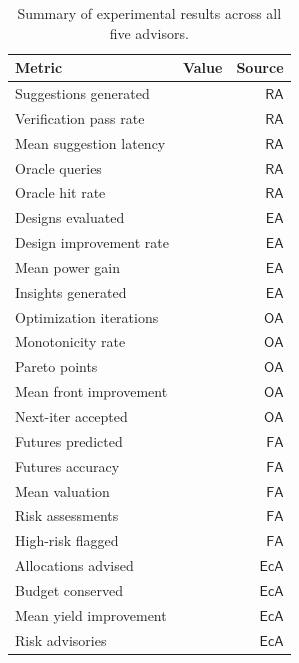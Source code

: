 \documentclass[11pt]{article}
\newcommand{\RA}{\mathsf{RA}}
\newcommand{\EA}{\mathsf{EA}}
\newcommand{\OA}{\mathsf{OA}}
\newcommand{\FA}{\mathsf{FA}}
\newcommand{\EcA}{\mathsf{EcA}}
\begin{document}
\begin{table}[t]
\centering
\caption{Summary of experimental results across all five advisors.}
\label{tab:results-summary}
\begin{tabular}{l r r}
\hline
\textbf{Metric} & \textbf{Value} & \textbf{Source} \\
\hline
Suggestions generated       & \ppXCIsuggestionsGenerated{}  & $\RA$ \\
Verification pass rate      & \ppXCIverificationPassRate{}  & $\RA$ \\
Mean suggestion latency     & \ppXCImeanSuggestionLatency{} & $\RA$ \\
Oracle queries              & \ppXCIoracleQueries{}         & $\RA$ \\
Oracle hit rate             & \ppXCIoracleHitRate{}         & $\RA$ \\
\hline
Designs evaluated           & \ppXCIdesignsEvaluated{}      & $\EA$ \\
Design improvement rate     & \ppXCIdesignImprovementRate{} & $\EA$ \\
Mean power gain             & \ppXCImeanPowerGain{}         & $\EA$ \\
Insights generated          & \ppXCIinsightsGenerated{}     & $\EA$ \\
\hline
Optimization iterations     & \ppXCIoptIterations{}         & $\OA$ \\
Monotonicity rate           & \ppXCIoptMonotonicity{}       & $\OA$ \\
Pareto points               & \ppXCIoptParetoPoints{}       & $\OA$ \\
Mean front improvement      & \ppXCImeanFrontImprovement{}  & $\OA$ \\
Next-iter accepted          & \ppXCIoptNextAccepted{}       & $\OA$ \\
\hline
Futures predicted           & \ppXCIfuturesPredicted{}      & $\FA$ \\
Futures accuracy            & \ppXCIfuturesAccuracy{}       & $\FA$ \\
Mean valuation              & \ppXCImeanValuation{}         & $\FA$ \\
Risk assessments            & \ppXCIriskAssessments{}       & $\FA$ \\
High-risk flagged           & \ppXCIhighRiskFlagged{}       & $\FA$ \\
\hline
Allocations advised         & \ppXCIallocationsAdvised{}    & $\EcA$ \\
Budget conserved            & \ppXCIbudgetConserved{}       & $\EcA$ \\
Mean yield improvement      & \ppXCImeanYieldImprovement{}  & $\EcA$ \\
Risk advisories             & \ppXCIriskAdvisories{}        & $\EcA$ \\
\hline
\end{tabular}
\end{table}
\end{document}
